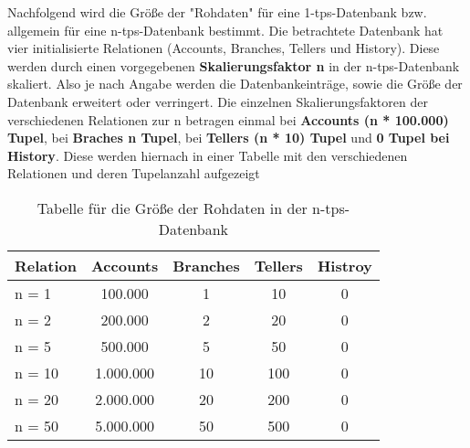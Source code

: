 Nachfolgend wird die Größe der "Rohdaten" für eine 1-tps-Datenbank bzw. allgemein für eine n-tps-Datenbank bestimmt.
Die betrachtete Datenbank hat vier initialisierte Relationen (Accounts, Branches, Tellers und History).
Diese werden durch einen vorgegebenen \textbf{Skalierungsfaktor n} in der n-tps-Datenbank skaliert. Also je nach
Angabe werden die Datenbankeinträge, sowie die Größe der Datenbank erweitert oder verringert. Die einzelnen Skalierungsfaktoren
der verschiedenen Relationen zur n betragen einmal bei \textbf{Accounts (n * 100.000) Tupel}, bei \textbf{Braches n Tupel},
bei \textbf{Tellers (n * 10) Tupel} und \textbf{0 Tupel bei History}. Diese werden hiernach in einer Tabelle mit den
verschiedenen Relationen und deren Tupelanzahl aufgezeigt
\begin{table}[h!]
    \centering
    \begin{tabular}{|p{2.5cm}|c|c|c|c|}
        \hline
        Relation & Accounts & Branches & Tellers & Histroy \\  \hline
        n = 1 & 100.000 & 1 & 10 & 0 \\ \hline
        n = 2 & 200.000 & 2 & 20 & 0 \\ \hline
        n = 5 & 500.000 & 5 & 50 & 0 \\ \hline
        n = 10 & 1.000.000 & 10 & 100 & 0 \\ \hline
        n = 20 & 2.000.000& 20 & 200 & 0 \\ \hline
        n = 50 & 5.000.000& 50 & 500 & 0 \\ \hline
    \end{tabular}
    \caption{Tabelle für die Größe der Rohdaten in der n-tps-Datenbank}
    \label{table:1}
\end{table}